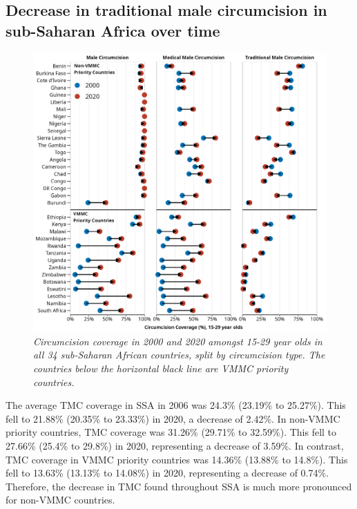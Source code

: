 \documentclass{article}
\begin{document}
\subsection{Decrease in traditional male circumcision in sub-Saharan Africa over time}
\label{sec:org5fb5e18}

\begin{figure}[H]
    \centering
    \includegraphics[width=1\linewidth]
    {figures/paper/05_change_00_20.png}
    \caption{\emph{Circumcision coverage in 2000 and 2020 amongst 15-29 year olds in all 34 sub-Saharan African countries, split by circumcision type. The countries below the horizontal black line are VMMC priority countries.}}
\end{figure}

The average TMC coverage in SSA in 2006 was 24.3\% (23.19\% to 25.27\%). This fell to 21.88\% (20.35\% to 23.33\%) in 2020, a decrease of 2.42\%. In non-VMMC priority countries, TMC coverage was 31.26\% (29.71\% to 32.59\%). This fell to 27.66\% (25.4\% to 29.8\%) in 2020, representing a decrease of 3.59\%. In contrast, TMC coverage in VMMC priority countries was 14.36\% (13.88\% to 14.8\%). This fell to 13.63\% (13.13\% to 14.08\%) in 2020, representing a decrease of 0.74\%. Therefore, the decrease in TMC found throughout SSA is much more pronounced for non-VMMC countries.
\end{document}
